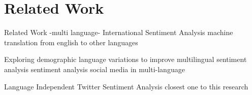 \chapter{Related Work}
Related Work -multi language-
International Sentiment Analysis
machine translation from english to other languages

Exploring demographic language variations to improve multilingual sentiment analysis
sentiment analysis social media in multi-language

Language Independent Twitter Sentiment Analysis
closest one to this research
